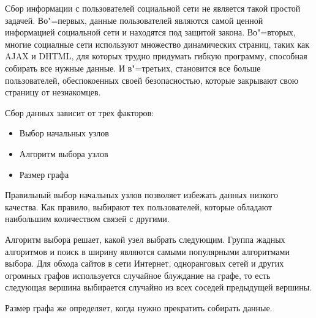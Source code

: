 Сбор информации с пользователей социальной сети не является такой простой задачей. Во"=первых, данные пользователей являются самой ценной информацией социальной сети и находятся под защитой закона. Во"=вторых, многие социалные сети используют множество динамических страниц, таких как AJAX и DHTML, для которых трудно придумать гибкую программу, способная собирать все нужные данные. И в"=третьих, становится все больше пользователей, обеспокоенных своей безопасностью, которые закрывают свою страницу от незнакомцев. 

Сбор данных зависит от трех факторов:
\begin{itemize}
    \item Выбор начальных узлов
    \item Алгоритм выбора узлов
    \item Размер графа
\end{itemize}
Правильный выбор начальных узлов позволяет избежать данных низкого качества. Как правило, выбирают тех пользователей, которые обладают наибольшим количеством связей с другими\cite{wong2014design}.

Алгоритм выбора решает, какой узел выбрать следующим. Группа жадных алгоритмов и поиск в ширину являются самыми популярными алгоритмами выбора\cite{CrawlingONS}. Для обхода сайтов в сети Интернет, одноранговых сетей и других огромных графов используется случайное блуждание на графе, то есть следующая вершина выбирается случайно из всех соседей предыдущей вершины\cite{gjoka2011practical}.

Размер графа же определяет, когда нужно прекратить собирать данные.